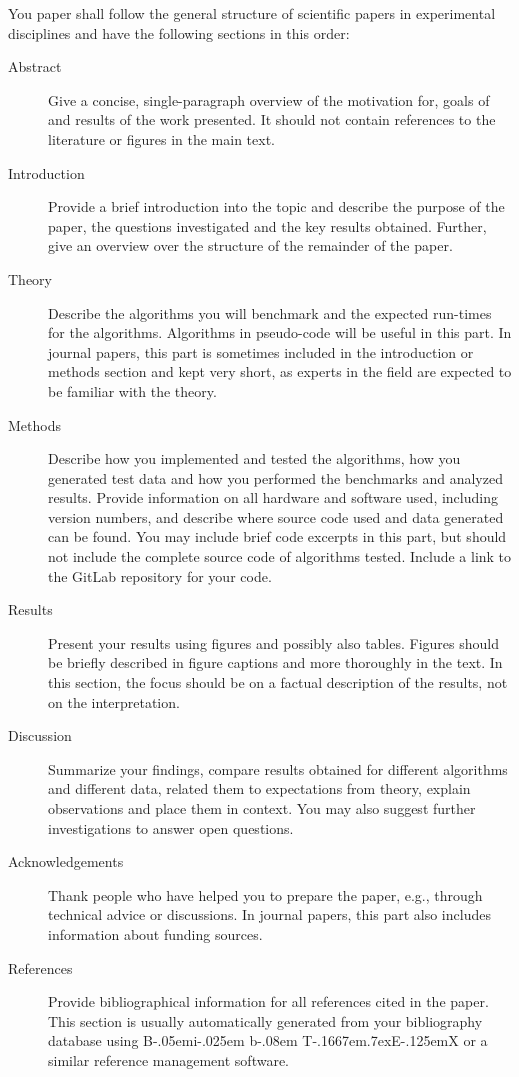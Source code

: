 \documentclass[sigconf, nonacm, natbib, screen, balance=False]{acmart}
\def\BibTeX{{\rm B\kern-.05em{\sc i\kern-.025em b}\kern-.08em
    T\kern-.1667em\lower.7ex\hbox{E}\kern-.125emX}}
\begin{document}
You paper shall follow the general structure of scientific papers in
experimental disciplines and have the following sections in this
order:
\begin{description}
  \item[Abstract] Give a concise, single-paragraph overview of the
    motivation for, goals of and results of the work presented. It
    should not contain references to the literature or figures in the
    main text.
  \item[Introduction] Provide a brief introduction into the topic and
    describe the purpose of the paper, the questions investigated and
    the key results obtained. Further, give an overview over the
    structure of the remainder of the paper.
  \item[Theory] Describe the algorithms you will benchmark and the
    expected run-times for the algorithms. Algorithms in pseudo-code
    will be useful in this part. In journal papers, this part is
    sometimes included in the introduction or methods section and kept
    very short, as experts in the field are expected to be familiar
    with the theory.
  \item[Methods] Describe how you implemented and tested the
    algorithms, how you generated test data and how you performed the
    benchmarks and analyzed results. Provide information on all
    hardware and software used, including version numbers, and
    describe where source code used and data generated can be
    found. You may include brief code excerpts in this part, but
    should not include the complete source code of algorithms
    tested. Include a link to the GitLab repository for your code.
  \item[Results] Present your results using figures and possibly also
    tables. Figures should be briefly described in figure captions and
    more thoroughly in the text. In this section, the focus should be
    on a factual description of the results, not on the
    interpretation.
  \item[Discussion] Summarize your findings, compare results obtained
    for different algorithms and different data, related them to
    expectations from theory, explain observations and place them in
    context. You may also suggest further investigations to answer
    open questions.
  \item[Acknowledgements] Thank people who have helped you to prepare
    the paper, e.g., through technical advice or discussions. In
    journal papers, this part also includes information about funding
    sources.
  \item[References] Provide bibliographical information for all
    references cited in the paper. This section is usually
    automatically generated from your bibliography database using
    \BibTeX{} or a similar reference management software.
  \end{description}
  
\end{document}
